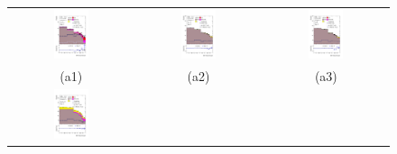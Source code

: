 \begin{figure}[H]
\begin{tabular}{@{}ccc@{}}
\includegraphics[width=0.3\textwidth]{figures/tcH_reg1l2tau1bnj_os.pdf}&
\includegraphics[width=0.3\textwidth]{figures/tcH_reg1l1tau1b1j_ss.pdf}&
\includegraphics[width=0.3\textwidth]{figures/tcH_reg1l1tau1b2j_ss.pdf}\\
(a1)  & (a2) & (a3) \\
\includegraphics[width=0.3\textwidth]{figures/tcH_reg1l1tau1b2j_os.pdf}&

\end{tabular}
\end{figure}
